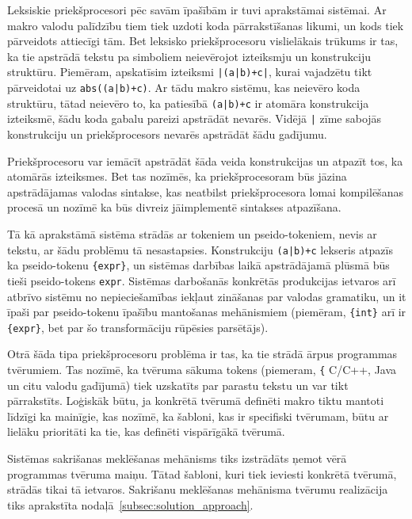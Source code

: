 Leksiskie priekšprocesori pēc savām īpašībām ir tuvi aprakstāmai sistēmai. Ar makro valodu palīdzību tiem tiek uzdoti koda pārrakstīšanas likumi, un kods tiek pārveidots attiecīgi tām. Bet leksisko priekšprocesoru vislielākais trūkums ir tas, ka tie apstrādā tekstu pa simboliem neievērojot izteiksmju un konstrukciju struktūru. Piemēram, apskatīsim izteiksmi \verb/|(a|b)+c|/, kurai vajadzētu tikt pārveidotai uz \verb/abs((a|b)+c)/. Ar tādu makro sistēmu, kas neievēro koda struktūru, tātad neievēro to, ka patiesībā \verb/(a|b)+c/ ir atomāra konstrukcija izteiksmē, šādu koda gabalu pareizi apstrādāt nevarēs. Vidējā \verb/|/ zīme sabojās konstrukciju un priekšprocesors nevarēs apstrādāt šādu gadījumu.

Priekšprocesoru var iemācīt apstrādāt šāda veida konstrukcijas un atpazīt tos, ka atomārās izteiksmes. Bet tas nozīmēs, ka priekšprocesoram būs jāzina apstrādājamas valodas sintakse, kas neatbilst priekšprocesora lomai kompilēšanas procesā un nozīmē ka būs divreiz jāimplementē sintakses atpazīšana.

Tā kā aprakstāmā sistēma strādās ar tokeniem un pseido-tokeniem, nevis ar tekstu, ar šādu problēmu tā nesastapsies. Konstrukciju \verb/(a|b)+c/ lekseris atpazīs ka pseido-tokenu \verb|{expr}|, un sistēmas darbības laikā apstrādājamā plūsmā būs tieši pseido-tokens \verb|expr|. Sistēmas darbošanās konkrētās produkcijas ietvaros arī atbrīvo sistēmu no nepieciešamības iekļaut zināšanas par valodas gramatiku, un it īpaši par pseido-tokenu īpašību mantošanas mehānismiem (piemēram, \verb|{int}| arī ir \verb|{expr}|, bet par šo transformāciju rūpēsies parsētājs).

Otrā šāda tipa priekšprocesoru problēma ir tas, ka tie strādā ārpus programmas tvērumiem. Tas nozīmē, ka tvēruma sākuma tokens (piemeram, \verb|{| C/C++, Java un citu valodu gadījumā) tiek uzskatīts par parastu tekstu un var tikt pārrakstīts. Loģiskāk būtu, ja konkrētā tvērumā definēti makro tiktu mantoti līdzīgi ka mainīgie, kas nozīmē, ka šabloni, kas ir specifiski tvērumam, būtu ar lielāku prioritāti ka tie, kas definēti vispārīgākā tvērumā. 

Sistēmas sakrišanas meklēšanas mehānisms tiks izstrādāts ņemot vērā programmas tvēruma maiņu. Tātad šabloni, kuri tiek ieviesti konkrētā tvērumā, strādās tikai tā ietvaros. Sakrišanu meklēšanas mehānisma tvērumu realizācija tiks aprakstīta nodaļā~\ref{subsec:solution_approach}.

